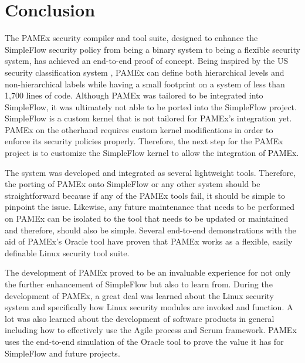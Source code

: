 \section{Conclusion}
\label{sec:Conclusion}
\par 
\vspace{\baselineskip}
\hspace{1em}
The PAMEx security compiler and tool suite, designed to enhance the 
SimpleFlow security policy from being a binary system to being a 
flexible security system, has achieved an end-to-end proof of concept. 
Being inspired by the US security classification system \cite{natsecinfo}, PAMEx can 
define both hierarchical levels and non-hierarchical labels while 
having a small footprint on a system of less than 1,700 lines 
of code. Although PAMEx was tailored to be integrated into SimpleFlow, it was ultimately
not able to be ported into the SimpleFlow project. SimpleFlow is a custom kernel that is
not tailored for PAMEx's integration yet. PAMEx on the otherhand requires custom kernel modifications
in order to enforce its security policies properly. Therefore, the next step for the PAMEx
project is to customize the SimpleFlow kernel to allow the integration of PAMEx.

The system was developed and integrated as several lightweight 
tools. Therefore, the porting of PAMEx onto SimpleFlow or any 
other system should be straightforward because if any of the PAMEx 
tools fail, it should be simple to pinpoint the issue. 
Likewise, any future maintenance that needs to be performed on PAMEx 
can be isolated to the tool that needs to be updated or maintained and 
therefore, should also be simple. Several end-to-end demonstrations
with the aid of PAMEx's Oracle tool have proven that PAMEx works as a 
flexible, easily definable Linux security tool suite.

The development of PAMEx proved to be an invaluable experience for not 
only the further enhancement of SimpleFlow but also to 
learn from. During the development of PAMEx, a great deal was learned about the Linux security system and specifically how Linux security 
modules are invoked and function. A lot was also learned about the development of software products in general including how 
to effectively use the Agile process and Scrum framework. PAMEx uses the end-to-end simulation of the Oracle tool to prove the 
value it has for SimpleFlow and future projects. 